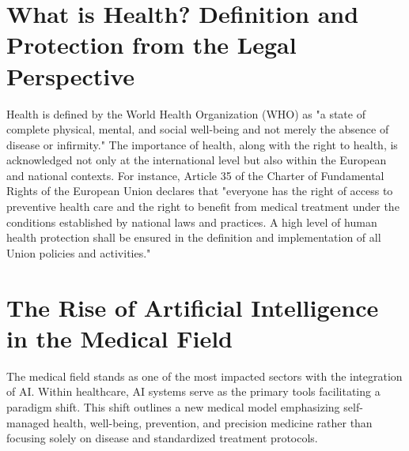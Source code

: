 \section{What is Health? Definition and Protection from the Legal Perspective}
Health is defined by the World Health Organization (WHO) as "a state of complete physical, mental, and social well-being and not merely the absence of disease or infirmity." The importance of health, along with the right to health, is acknowledged not only at the international level but also within the European and national contexts. For instance, Article 35 of the Charter of Fundamental Rights of the European Union declares that "everyone has the right of access to preventive health care and the right to benefit from medical treatment under the conditions established by national laws and practices. A high level of human health protection shall be ensured in the definition and implementation of all Union policies and activities."

\section{The Rise of Artificial Intelligence in the Medical Field}
The medical field stands as one of the most impacted sectors with the integration of AI. Within healthcare, AI systems serve as the primary tools facilitating a paradigm shift. This shift outlines a new medical model emphasizing self-managed health, well-being, prevention, and precision medicine rather than focusing solely on disease and standardized treatment protocols.

